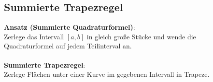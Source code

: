 \subsection{Summierte Trapezregel}%
\label{ni:sub:summierte-trapezregel}
\textbf{Ansatz (Summierte Quadraturformel)}:\\Zerlege das Intervall $[a, b]$ in gleich große Stücke und wende die Quadraturformel auf jedem Teilinterval an.\\\\
\textbf{Summierte Trapezregel}:\\Zerlege Flächen unter einer Kurve im gegebenen Intervall in Trapeze.